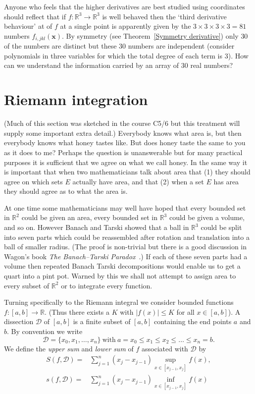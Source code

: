 Anyone who feels that the higher derivatives are best
studied using coordinates should reflect
that if $f:{\mathbb R}^{3}\rightarrow{\mathbb R}^{3}$
is well behaved then the `third derivative behaviour'
at of $f$ at a single point is apparently
given by the
$3\times3\times3\times3=81$ numbers
$f_{i,jkl}(\mathbf{x})$. By symmetry (see
Theorem~\ref{Symmetry derivative}) only $30$
of the numbers are distinct but these
$30$ numbers are independent  (consider
polynomials in three variables  for which
the total degree of each term is $3$).
How can we understand the information carried
by an array of $30$ real numbers?
\section{Riemann integration}\label{Riemann integration}
(Much of this section was sketched in the course C5/6
but this treatment will supply some important
extra detail.) Everybody knows what area is,
but then everybody knows what honey tastes like.
But does honey taste the same to you as it
does to me? Perhaps the question is unanswerable
but for many practical purposes it is sufficient
that we agree on what we call honey.
In the same way it is important that when
two mathematicians talk about area that
(1) they should agree on which sets $E$ actually have area,
and that
(2) when a set $E$ has area they should agree as
to what the area is.

At one time some mathematicians may well have
hoped that every bounded set in ${\mathbb R}^{2}$
could be given an area,
every bounded set in ${\mathbb R}^{3}$ could be given a volume,
and so on.
However Banach and Tarski showed that a ball
in ${\mathbb R}^{3}$ could be split into seven
parts which could be reassembled after rotation
and translation into a ball of smaller radius.
(The proof is non-trivial but there is a good discussion
in Wagon's book \emph{The Banach--Tarski Paradox}~\cite{Wagon}.)
If each of these seven parts had a volume then
repeated Banach Tarski decompositions would enable
us to get a quart into a pint pot.
Warned by this we shall not attempt to assign
area to every subset of ${\mathbb R}^{2}$ or
to integrate every function.

Turning specifically to the Riemann integral we
consider bounded functions $f:[a,b]\rightarrow{\mathbb R}$.
(Thus there exists a $K$ with $|f(x)|\leq K$ for all
$x\in[a,b]$). A dissection $\mathcal{D}$ of $[a,b]$
is a finite subset of $[a,b]$ containing the end
points $a$ and $b$. By convention we write
\[\mathcal{D}=\{x_{0},x_{1},\dots,x_{n}\}
\ \text{with}\ a=x_{0}\leq x_{1}\leq x_{2}\leq\dots\leq x_{n}=b.\]
We define the \emph{upper sum} and \emph{lower sum}
of $f$ associated with $\mathcal{D}$ by
\begin{align*}
S(f,\mathcal{D})=&\sum_{j=1}^{n}(x_{j}-x_{j-1})
\sup_{x\in [x_{j-1},x_{j}]}f(x),\\
s(f,\mathcal{D})=&\sum_{j=1}^{n}(x_{j}-x_{j-1})
\inf_{x\in [x_{j-1},x_{j}]}f(x)
\end{align*}

